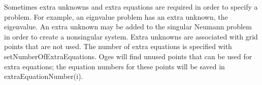 \documentclass[11pt]{article}
\begin{document}

Sometimes extra unknowns and extra equations are required in order to 
specify a problem.
For example, an eignvalue problem has an extra unknown, the eigenvalue.
An extra unknown may be added to the singular Neumann problem in order
to create a nonsingular system.
Extra unknowns are associated with grid points that are not used.
The number of extra equations is specified with {\ff setNumberOfExtraEquations}.
Oges will find unused points that can be used for extra equations; the
equation numbers for these points will be saved in {\ff extraEquationNumber(i)}.
\end{document}
